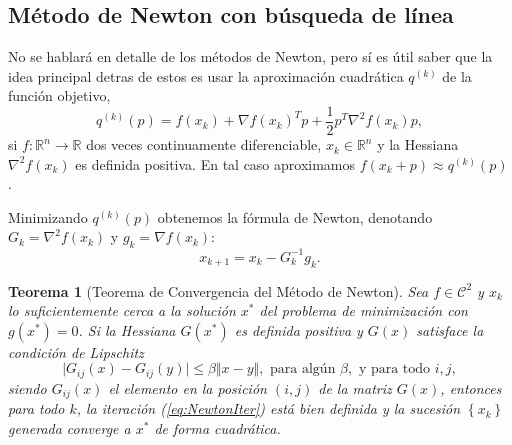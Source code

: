 \documentclass[11pt,a4paper]{book}
\newtheorem{theorem}{Teorema}[chapter]
\theoremstyle{definition}
\theoremstyle{remark}
\begin{document}

\subsection{Método de Newton con búsqueda de línea}
No se hablará en detalle de los métodos de Newton, pero sí es útil saber que la idea principal detras de estos
es usar la aproximación cuadrática $q^{(k)}$ de la función objetivo,
\begin{equation}
	q^{(k)}(p) = f(x_k)+\nabla f(x_k)^Tp + \frac{1}{2}p^T \nabla^2 f(x_k)p,
	\label{eq:NewtonQ}
\end{equation}
si $f:\mathbb{R}^n \rightarrow \mathbb{R}$ dos veces continuamente diferenciable, $x_k \in \mathbb{R}^n$ y la Hessiana $\nabla^2f(x_k)$ es definida positiva. En tal caso aproximamos $f(x_k + p) \approx q^{(k)}(p)$.

Minimizando $q^{(k)}(p)$ obtenemos la fórmula de Newton, denotando $G_k=\nabla^2f(x_k)$ y $g_k = \nabla f(x_k)$:
\begin{equation}
	x_{k+1} = x_k - G_k^{-1} g_k.
	\label{eq:NewtonIter}
\end{equation}

\begin{theorem}[Teorema de Convergencia del Método de Newton]
	Sea
	$f \in \mathcal{C}^2$ y $x_k$ lo suficientemente cerca a
	la solución $x^*$ del problema de minimización con
	$g(x^*)=0$. Si la Hessiana $G(x^*)$ es definida positiva y
	$G(x)$ satisface la condición de Lipschitz
	\begin{equation}
		\vert G_{ij}(x) - G_{ij}(y) \vert \leq 
		\beta \Vert x-y \Vert,
		\text{ para algún } \beta,
		\text{ y para todo } i,j,
	\end{equation}
	siendo $G_{ij}(x)$ el elemento en la posición $(i,j)$ de la matriz
	$G(x)$, entonces para todo $k$, la iteración (\ref{eq:NewtonIter})
	está bien definida y la sucesión $\left\{ x_k \right\}$
	generada converge a $x^*$ de forma cuadrática.
\end{theorem}
\end{document}
